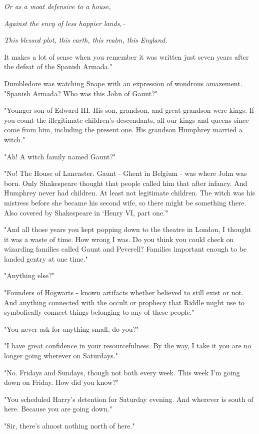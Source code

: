 \emph{Or as a moat defensive to a house,}

\emph{Against the envy of less happier lands,--}

\emph{This blessed plot, this earth, this realm, this England.}

It makes a lot of sense when you remember it was written just seven years after the defeat of the Spanish Armada."

Dumbledore was watching Snape with an expression of wondrous amazement. "Spanish Armada? Who was this John of Gaunt?"

"Younger son of Edward III. His son, grandson, and great-grandson were kings. If you count the illegitimate children's descendants, all our kings and queens since come from him, including the present one. His grandson Humphrey married a witch."

"Ah! A witch family named Gaunt?"

"No! The House of Lancaster. Gaunt - Ghent in Belgium - was where John was born. Only Shakespeare thought that people called him that after infancy. And Humphrey never had children. At least not legitimate children. The witch was his mistress before she became his second wife, so there might be something there. Also covered by Shakespeare in{\el} `Henry VI, part one.'"

"And all those years you kept popping down to the theatre in London, I thought it was a waste of time. How wrong I was. Do you think you could check on wizarding families called Gaunt and Peverell? Families important enough to be landed gentry at one time."

"Anything else?"

"Founders of Hogwarts - known artifacts whether believed to still exist or not. And anything connected with the occult or prophecy that Riddle might use to symbolically connect things belonging to any of these people."

"You never ask for anything small, do you?"

"I have great confidence in your resourcefulness. By the way, I take it you are no longer going{\el} wherever{\el} on Saturdays."

"No. Fridays and Sundays, though not both every week. This week I'm going down on Friday. How did you know?"

"You scheduled Harry's detention for Saturday evening. And{\el} wherever{\el} is south of here. Because you are going down."

"Sir, there's almost nothing north of here."


